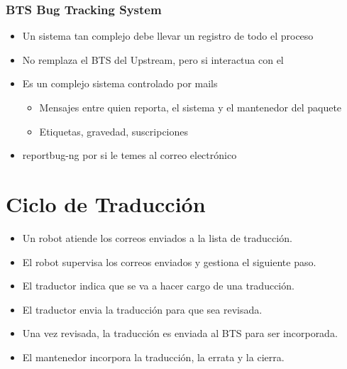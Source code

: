 \documentclass{beamer}
\begin{document}
\begin{frame}
  \frametitle {BTS Bug Tracking System}
  \begin{itemize}  
  \item Un sistema tan complejo debe llevar un registro de todo el proceso
  \item No remplaza el BTS del Upstream, pero si interactua con el
  \item Es un complejo sistema controlado por mails
    \begin{itemize}
    \item Mensajes entre quien reporta, el sistema y el mantenedor del paquete
    \item Etiquetas, gravedad, suscripciones    
    \end{itemize}
  \item reportbug-ng por si le temes al correo electrónico
  \end{itemize}
\end{frame}



\section[Traducción]{Ciclo de Traducción}

\begin{frame}
  \begin{itemize}
  \item Un robot atiende los correos enviados a la lista de traducción.
  \item El robot supervisa los correos enviados y gestiona el siguiente paso.
  \item El traductor indica que se va a hacer cargo de una traducción.
  \item El traductor envia la traducción para que sea revisada.
  \item Una vez revisada, la traducción es enviada al BTS para ser incorporada.
  \item El mantenedor incorpora la traducción, la errata y la cierra.
  \end{itemize}
\end{frame}
\end{document}
